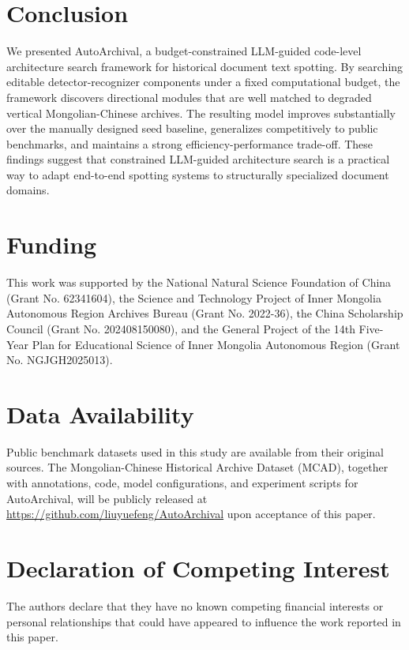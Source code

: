 \documentclass[a4paper,fleqn,longmktitle]{cas-sc}
\begin{document}
\section{Conclusion}

We presented AutoArchival, a budget-constrained LLM-guided code-level architecture search framework for historical document text spotting. By searching editable detector-recognizer components under a fixed computational budget, the framework discovers directional modules that are well matched to degraded vertical Mongolian-Chinese archives. The resulting model improves substantially over the manually designed seed baseline, generalizes competitively to public benchmarks, and maintains a strong efficiency-performance trade-off. These findings suggest that constrained LLM-guided architecture search is a practical way to adapt end-to-end spotting systems to structurally specialized document domains.

\section*{Funding}

This work was supported by the National Natural Science Foundation of China (Grant No. 62341604), the Science and Technology Project of Inner Mongolia Autonomous Region Archives Bureau (Grant No. 2022-36), the China Scholarship Council (Grant No. 202408150080), and the General Project of the 14th Five-Year Plan for Educational Science of Inner Mongolia Autonomous Region (Grant No. NGJGH2025013).

\section*{Data Availability}

Public benchmark datasets used in this study are available from their original sources. The Mongolian-Chinese Historical Archive Dataset (MCAD), together with annotations, code, model configurations, and experiment scripts for AutoArchival, will be publicly released at \url{https://github.com/liuyuefeng/AutoArchival} upon acceptance of this paper.

\section*{Declaration of Competing Interest}

The authors declare that they have no known competing financial interests or personal relationships that could have appeared to influence the work reported in this paper.
\end{document}
